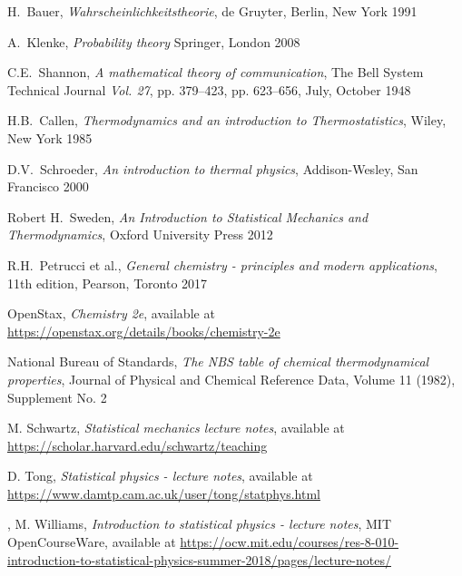 \documentclass[a4paper, draft]{article}
\theoremstyle{own}
\theoremstyle{remark}
\begin{document}
\begin{thebibliography}{9}
	
H.~Bauer,
{\em Wahrscheinlichkeitstheorie},
de Gruyter, Berlin, New York 1991
	
A.~Klenke,
{\em Probability theory}
Springer, London 2008


C.E.~Shannon,
{\em A mathematical theory of communication}, 
The Bell System Technical Journal {\em Vol. 27}, pp. 379--423, pp. 623--656, July, October 1948



H.B.~Callen,
{\em Thermodynamics and an introduction to Thermostatistics},
Wiley, New York 1985


D.V.~Schroeder,
{\em An introduction to thermal physics},
Addison-Wesley, San Francisco 2000

Robert H.~Sweden,
{\em An Introduction to Statistical Mechanics and Thermodynamics}, Oxford University Press 2012

R.H.~Petrucci et al., 
{\em General chemistry - principles and modern applications}, 11th edition, Pearson, Toronto 2017

OpenStax, {\em Chemistry 2e}, available at \url{https://openstax.org/details/books/chemistry-2e}

National Bureau of Standards, {\em The NBS table of chemical thermodynamical properties}, Journal of Physical and Chemical Reference Data, Volume 11 (1982), Supplement No. 2

M. Schwartz, {\em Statistical mechanics lecture notes}, available at \url{https://scholar.harvard.edu/schwartz/teaching}	

D. Tong, {\em Statistical physics - lecture notes}, available at \url{https://www.damtp.cam.ac.uk/user/tong/statphys.html}

,
M. Williams, {\em Introduction to statistical physics - lecture notes}, MIT OpenCourseWare, available at \url{https://ocw.mit.edu/courses/res-8-010-introduction-to-statistical-physics-summer-2018/pages/lecture-notes/}

\end{thebibliography}
\end{document}
